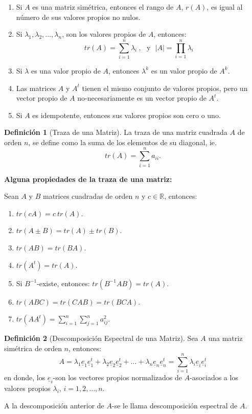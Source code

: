 \documentclass[
]{book}
\theoremstyle{definition}
\newtheorem{definition}{Definición}[chapter]
\theoremstyle{definition}
\theoremstyle{definition}
\theoremstyle{definition}
\theoremstyle{remark}
\begin{document}
\begin{enumerate}
\def\labelenumi{\alph{enumi}.}
\setcounter{enumi}{3}
\item
  Si \(A\) es una matriz simétrica, entonces el rango de \(A\), \(r(A)\), es igual al número de sus valores propios no nulos.
\item
  Si \(\lambda_1,\lambda_2,\ldots, \lambda_n\), son los valores propios de \(A\), entonces:
  \[
                 tr(A)=\sum_{i=1}^n \lambda_i\ , \ \ \ \text{y} \ \ \
               |A|=\prod_{i=1}^n \lambda_i
  \]
\item
  Si \(\lambda\) es una valor propio de \(A\), entonces \(\lambda^k\) es un valor propio de \(A^k\).
\item
  Las matrices \(A\) y \(A^t\) tienen el mismo conjunto de valores propios, pero un vector propio de \(A\) no-necesariamente es un vector propio de \(A^t\).
\item
  Si \(A\) es idempotente, entonces sus valores propios son cero o uno.
\end{enumerate}

\begin{definition}[Traza de una Matriz]
\protect\hypertarget{def:traza-matriz}{}\label{def:traza-matriz}La traza de una matriz cuadrada \(A\) de orden \(n\), se define como la suma de los elementos de su diagonal, ie.
\[
tr(A)=\sum_{i=1}^n a_{ii}.
\]
\end{definition}

\textbf{Alguna propiedades de la traza de una matriz:}

Sean \(A\) y \(B\) matrices cuadradas de orden \(n\) y \(c\in \mathbb{R}\), entonces:

\begin{enumerate}
\def\labelenumi{\alph{enumi}.}
\item
  \(tr(c A)=c\ tr(A)\).
\item
  \(tr(A \pm B)=tr(A)\pm tr(B)\).
\item
  \(tr(AB)=tr(BA)\).
\item
  \(tr(A^t)= tr(A)\).
\item
  Si \(B^{-1}\)-existe, entonces: \(tr(B^{-1}AB)=tr(A)\).
\item
  \(tr(ABC)=tr(CAB)=tr(BCA)\).
\item
  \(tr(AA^t)=\sum_{i=1}^n\sum_{j=1}^n a_{ij}^2\).
\end{enumerate}

\begin{definition}[Descomposición Espectral de una Matriz]
\protect\hypertarget{def:descomp-espectral}{}\label{def:descomp-espectral}Sea \(A\) una matriz simétrica de orden \(n\), entonces:
\[
                  A=\lambda_1\underline{e}_1\underline{e}_1^t+
                  \lambda_2\underline{e}_2\underline{e}_2^t+\ldots+
                  \lambda_n\underline{e}_n\underline{e}_n^t=\sum_{i=1}^n \lambda_i\underline{e}_i\underline{e}_i^t
\]
en donde, los \(\underline{e}_i\)-son los vectores propios normalizados de \(A\)-asociados a los valores propios \(\lambda_i\), \(i=1,2,\ldots,n\).

A la descomposición anterior de \(A\)-se le llama descomposición espectral de \(A\).
\end{definition}
\end{document}
